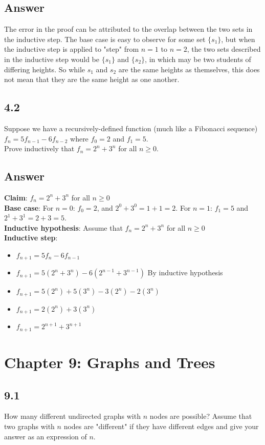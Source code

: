 \documentclass{article}
\begin{document}
\subsection*{Answer}
The error in the proof can be attributed to the overlap between the two sets in the inductive step. The base case is easy to observe for some set $\{s_1\}$, but when the inductive step is applied to "step" from $n=1$ to $n=2$, the two sets described in the inductive step would be $\{s_1\}$ and $\{s_2\}$, in which may be two students of differing heights. So while $s_1$ and $s_2$ are the same heights as themselves, this does not mean that they are the same height as one another.
\newpage
\subsection*{4.2}
Suppose we have a recursively-defined function (much like a Fibonacci sequence) $f_n=5f_{n-1}-6f_{n-2}$ where $f_0=2$ and $f_1=5$.
\\ Prove inductively that $f_n=2^n+3^n$ for all $n\geq0$.
\subsection*{Answer}
\textbf{Claim}: $f_n=2^n+3^n$ for all $n\geq0$
\\ \textbf{Base case}: For $n=0$: $f_0=2$, and $2^0+3^0=1+1=2$. For $n=1$: $f_1=5$ and $2^1+3^1=2+3=5$.
\\ \textbf{Inductive hypothesis}: Assume that $f_n=2^n+3^n$ for all $n\geq0$
\\ \textbf{Inductive step}:
\begin{itemize}[label=]
    \item $f_{n+1}=5f_n-6f_{n-1}$
    \item $f_{n+1}=5(2^n+3^n)-6(2^{n-1}+3^{n-1})$ By inductive hypothesis
    \item $f_{n+1}=5(2^n)+5(3^n)-3(2^n)-2(3^n)$
    \item $f_{n+1}=2(2^n)+3(3^n)$
    \item $f_{n+1}=2^{n+1}+3^{n+1}$
\end{itemize}
\newpage
\section*{Chapter 9: Graphs and Trees}
\subsection*{9.1}
How many different undirected graphs with $n$ nodes are possible? Assume that two graphs with $n$ nodes are "different" if they have different edges and give your answer as an expression of $n$.
\newpage
\end{document}
